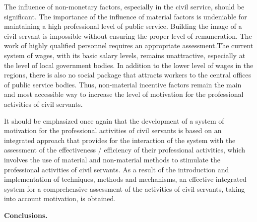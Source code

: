 \begin{multicols}{2}
The influence of non-monetary factors, especially in the civil service,
should be significant. The importance of the influence of material
factors is undeniable for maintaining a high professional level of
public service. Building the image of a civil servant is impossible
without ensuring the proper level of remuneration. The work of highly
qualified personnel requires an appropriate assessment.The current
system of wages, with its basic salary levels, remains unattractive,
especially at the level of local government bodies. In addition to the
lower level of wages in the regions, there is also no social package
that attracts workers to the central offices of public service bodies.
Thus, non-material incentive factors remain the main and most accessible
way to increase the level of motivation for the professional activities
of civil servants.

It should be emphasized once again that the development of a system of
motivation for the professional activities of civil servants is based on
an integrated approach that provides for the interaction of the system
with the assessment of the effectiveness / efficiency of their
professional activities, which involves the use of material and
non-material methods to stimulate the professional activities of civil
servants. As a result of the introduction and implementation of
techniques, methods and mechanisms, an effective integrated system for a
comprehensive assessment of the activities of civil servants, taking
into account motivation, is obtained.
\end{multicols}
{\bfseries Conclusions.}

